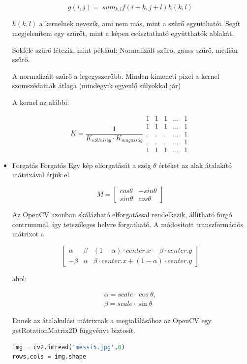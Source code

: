 \begin{itemize}
\[g (i, j) = \ sum_ {k, l} f (i + k, j + l) h (k, l)\]

$h(k, l)$ a kernelnek nevezik, ami nem más, mint a szűrő együtthatói. Segít megjeleníteni egy szűrőt, mint a képen csúsztatható együtthatók ablakát.

Sokféle szűrő létezik, mint például: Normalizált szűrő, gauss szűrő, medián szűrő.

A normalizált szűrő a legegyszerűbb. Minden kimeneti pixel a kernel szomszédainak átlaga (mindegyik egyenlő súlyokkal jár)

A kernel az alábbi:

\[K = \dfrac{1}{K_{szélesség} \cdot K_{magasság}}
\begin{matrix}
    1 & 1 & 1 & ... & 1 \\
    1 & 1 & 1 & ... & 1 \\
    . &. &. & ... & 1 \\
    . &. &. & ... & 1 \\
    1 & 1 & 1 & ... & 1   
\end{matrix}
\]
\item Forgatás
Forgatás
Egy kép elforgatását a szög $\theta$ értéket az alak átalakító mátrixával érjük el

$$M = \begin{bmatrix} cos\theta & -sin\theta \\ sin\theta & cos\theta   \end{bmatrix}$$

Az OpenCV azonban skálázható elforgatással rendelkezik, állítható forgó centrummal, így tetszőleges helyre forgatható. A módosított transzformációs mátrixot a

$$\begin{bmatrix}
\alpha &  \beta & (1- \alpha )  \cdot center.x -  \beta \cdot center.y \\ - \beta &  \alpha &  \beta \cdot center.x + (1- \alpha )  \cdot center.y
\end{bmatrix}$$

ahol:

$$\begin{array}{l}
\alpha =  scale \cdot \cos \theta , \\ \beta =  scale \cdot \sin \theta
\end{array}$$

Ennek az átalakulási mátrixnak a megtalálásához az OpenCV egy getRotationMatrix2D függvényt biztosít.

\begin{lstlisting}[language=Python]
img = cv2.imread('messi5.jpg',0)
rows,cols = img.shape


\end{lstlisting}
\end{itemize}
